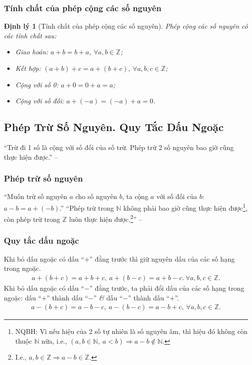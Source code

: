 \documentclass{article}
\numberwithin{equation}{section}
\newtheorem{dinhly}{Định lý}[section]
\begin{document}
\subsubsection{Tính chất của phép cộng các số nguyên}

\begin{dinhly}[Tính chất của phép cộng các số nguyên]
	Phép cộng các số nguyên có các tính chất sau:
	\begin{itemize}
		\item Giao hoán: $a + b = b + a$, $\forall a,b\in\mathbb{Z}$;
		\item Kết hợp: $(a + b) + c = a + (b + c)$, $\forall a,b,c\in\mathbb{Z}$;
		\item Cộng với số 0: $a + 0 = 0 + a = a$;
		\item Cộng với số đối: $a + (-a) = (-a) + a = 0$.
	\end{itemize}
\end{dinhly}


\subsection{Phép Trừ Số Nguyên. Quy Tắc Dấu Ngoặc}
``Trừ đi 1 số là cộng với số đối của số trừ. Phép trừ 2 số nguyên bao giờ cũng thực hiện được.'' -- \cite[p. 32]{Binh_Toan_6_tap_1}

\subsubsection{Phép trừ số nguyên}
``Muốn trừ số nguyên $a$ cho số nguyên $b$, ta cộng $a$ với số đối của $b$: $a - b = a + (-b)$.'' ``Phép trừ trong $\mathbb{N}$ không phải bao giờ cũng thực hiện được\footnote{NQBH: Vì nếu hiệu của 2 số tự nhiên là số nguyên âm, thì hiệu đó không còn thuộc $\mathbb{N}$ nữa, i.e., $(a,b\in\mathbb{N},\ a < b)\Rightarrow a - b\notin\mathbb{N}$.}, còn phép trừ trong $\mathbb{Z}$ luôn thực hiện được.\footnote{I.e., $a,b\in\mathbb{Z}\Rightarrow a - b\in\mathbb{Z}$.}'' -- \cite[p. 76]{SGK_Toan_6_Canh_Dieu_tap_1}

\subsubsection{Quy tắc dấu ngoặc}
Khi bỏ dấu ngoặc có dấu ``$+$'' đằng trước thì giữ nguyên dấu của các số hạng trong ngoặc.
\begin{align*}
	a + (b + c) = a + b + c,\ a + (b - c) = a + b - c.\ \forall a,b,c\in\mathbb{Z}.
\end{align*}
Khi bỏ dấu ngoặc có dấu ``$-$'' đằng trước, ta phải đổi dấu của các số hạng trong ngoặc: dấu ``$+$'' thành dấu ``$-$'' \textit{\&} dấu ``$-$'' thành dấu ``$+$''.
\begin{align*}
	a - (b + c) = a - b - c,\ a - (b - c) = a - b + c,\ \forall a,b,c\in\mathbb{Z}.
\end{align*}
\end{document}
